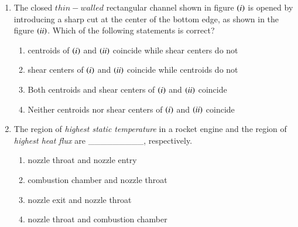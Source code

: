 \documentclass[journal,12pt,onecolumn]{IEEEtran}
\theoremstyle{remark}
\begin{document}
\begin{enumerate}
\item The closed $thin-walled$ rectangular channel shown in figure $\left(i\right)$ is opened by introducing a sharp cut at the center of the bottom edge, as shown in the figure $\left(ii\right)$. Which of the following statements is correct?

\begin{figure}[!ht]
	\centering
\end{figure}

\begin{enumerate}
	\item centroids of $\left(i\right)$ and $\left(ii\right)$ coincide while shear centers do not
	\item shear centers of $\left(i\right)$ and $\left(ii\right)$ coincide while centroids do not
	\item Both centroids and shear centers of $\left(i\right)$ and $\left(ii\right)$ coincide
	\item Neither centroids nor shear centers of $\left(i\right)$ and $\left(ii\right)$ coincide
\end{enumerate}

\item The region of \textit{highest static temperature} in a rocket engine and the region of \textit{highest heat flux} are \_\_\_\_\_\_\_\_\_, respectively.

\begin{enumerate}
	\item nozzle throat and nozzle entry 
	\item combustion chamber and nozzle throat
	\item nozzle exit and nozzle throat
	\item nozzle throat and combustion chamber
\end{enumerate}


\end{enumerate}
\end{document}
